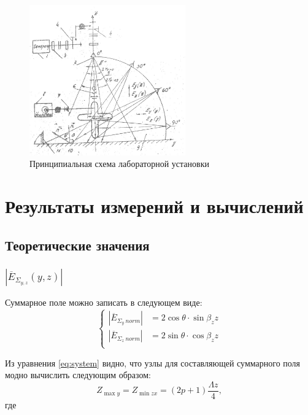 \documentclass[11pt,a4paper,oneside, titlepage,reqno]{amsproc}
\begin{document}
\begin{figure}[h!]
    \begin{center}
        \includegraphics[width=0.60\textwidth]{scheme.jpg}
    \end{center}
    \vspace{-20pt}
    \caption{Принципиальная схема лабораторной установки}
    \label{fig:scheme}
\end{figure}

\newpage
\section{Результаты измерений и вычислений}
\subsection{Теоретические значения}
\subsubsection{$|\overline{E}_{\Sigma_{y,z}}(y,z)|$}
Суммарное поле можно записать в следующем виде:\\
\begin{equation}
    \left\{
    \begin{aligned}
        |\overline{E}_{\Sigma_y~norm}| &= 2\cos\theta\cdot\sin\beta_zz\\
        |\overline{E}_{\Sigma_z~norm}| &= 2\sin\theta\cdot\cos\beta_zz\\
    \end{aligned}
    \right.
    \label{eq:system}
\end{equation}

Из уравнения \ref{eq:system} видно, что узлы для составляющей суммарного поля модно вычислить
следующим образом:
\begin{equation}
    Z_{\max y} = Z_{\min zx} = (2p + 1)\frac{\Lambda z}{4},
\end{equation}
где
\end{document}
